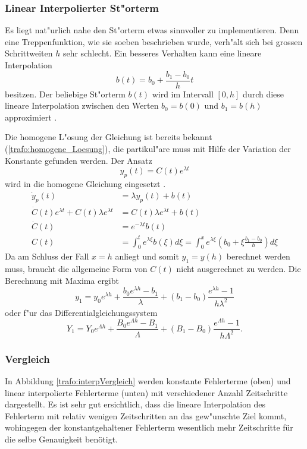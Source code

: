 \begin{refsection}
\subsubsection{Linear Interpolierter St"orterm}
Es liegt nat"urlich nahe den St"orterm etwas sinnvoller zu implementieren. Denn eine Treppenfunktion, wie sie soeben beschrieben wurde, verh"alt sich bei grossen Schrittweiten $h$ sehr schlecht. Ein besseres Verhalten kann eine lineare Interpolation
\begin{equation*}
	b(t) = b_0 + \frac{b_1 - b_0}{h}t
\end{equation*}
besitzen. Der beliebige St"orterm $b(t)$ wird im Intervall $[0,h]$ durch diese lineare Interpolation zwischen den Werten $b_0 = b(0)$ und $b_1 = b(h)$ approximiert \cite{trafo:Mueller}.

Die homogene L"osung der Gleichung ist bereits bekannt (\ref{trafo:homogene_Loesung}), die partikul"are muss mit Hilfe der Variation der Konstante gefunden werden. Der Ansatz
\begin{equation*}
	y_p(t) = C(t)e^{\lambda t}
\end{equation*}
wird in die homogene Gleichung eingesetzt \cite{trafo:Mueller}.
\begin{align*}
	\dot{y}_p(t) &= \lambda y_p(t) + b(t) \\
	\dot{C}(t)e^{\lambda t} + C(t)\lambda e^{\lambda t} &= C(t) \lambda e^{\lambda t} + b(t) \\
	\dot{C}(t) &= e^{-\lambda t} b(t) \\
	C(t) &= \int_{0}^{t} e^{\lambda \xi} b(\xi) d\xi = \int_{0}^{x} e^{\lambda \xi} \left(b_0 + \xi \frac{b_1 - b_0}{h}\right) d\xi
\end{align*}
Da am Schluss der Fall $x = h$ anliegt und somit $y_1 = y(h)$ berechnet werden muss, braucht die allgemeine Form von $C(t)$ nicht ausgerechnet zu werden. Die Berechnung mit Maxima ergibt \cite{trafo:Mueller}
\begin{equation}
	y_1 = y_0 e^{\lambda h} + \frac{b_0 e^{\lambda h} - b_1}{\lambda} + \left(b_1 - b_0\right) \frac{e^{\lambda h} -1}{h \lambda^2}
	\label{trafo:linInterp}
\end{equation}
oder f"ur das Differentialgleichungssystem
\begin{equation}
	Y_1 = Y_0 e^{\Lambda h} + \frac{B_0 e^{\Lambda h} - B_1}{\Lambda} + \left(B_1 - B_0\right) \frac{e^{\Lambda h} -1}{h \Lambda^2}.
	\label{trafo:exakteLoesung}
\end{equation}

\subsubsection{Vergleich}
In Abbildung \ref{trafo:interpVergleich} werden konstante Fehlerterme (oben) und linear interpolierte Fehlerterme (unten) mit verschiedener Anzahl Zeitschritte dargestellt. Es ist sehr gut ersichtlich, dass die lineare Interpolation des Fehlerterm mit relativ wenigen Zeitschritten an das gew"unschte Ziel kommt, wohingegen der konstantgehaltener Fehlerterm wesentlich mehr Zeitschritte für die selbe Genauigkeit benötigt. 


\end{refsection}
